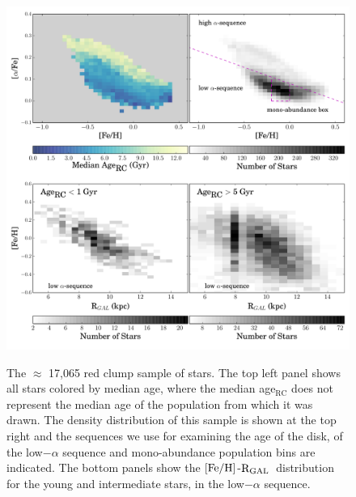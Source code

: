 \documentclass[12pt, preprint]{aastex}
\newcommand{\feh}{\mbox{$\rm [Fe/H]$}}
\newcommand{\rgal}{\mbox{$\rm R_{GAL}$}}
\begin{document}
\begin{figure}[p]
\centering
 \includegraphics[scale=0.5]{./plots/redclump_4panel.pdf}\\
    \caption{The $\approx$ 17,065 red clump sample of stars. The top left panel shows all stars colored by median age, where the median age$_{\mbox{RC}}$ does not represent the median age of the population from which it was drawn. The density distribution of this sample is shown at the top right and the sequences we use for examining the age of the disk, of the low$-\alpha$ sequence and mono-abundance population bins are indicated. The bottom panels show the \feh-\rgal\ distribution for the young and intermediate stars, in the low$-\alpha$ sequence.}
\label{fig:redclump}
\end{figure}
\end{document}
